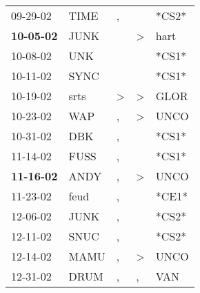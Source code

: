 \begin{supertabular}{p{0.07\textwidth}p{0.06\textwidth}p{0.02\textwidth}p{0.02\textwidth}p{0.06\textwidth}}
          09-29-02\textsuperscript{} &           TIME\textsuperscript{} &                , &                  &                            *CS2* \\
 \textbf{10-05-02\textsuperscript{}} &           JUNK\textsuperscript{} &                  &     \textgreater &           hart\textsuperscript{} \\
          10-08-02\textsuperscript{} &            UNK\textsuperscript{} &                  &                  &                            *CS1* \\
          10-11-02\textsuperscript{} &           SYNC\textsuperscript{} &                  &                  &                            *CS1* \\
          10-19-02\textsuperscript{} &           srts\textsuperscript{} &     \textgreater &     \textgreater &           GLOR\textsuperscript{} \\
          10-23-02\textsuperscript{} &            WAP\textsuperscript{} &                , &     \textgreater &           UNCO\textsuperscript{} \\
          10-31-02\textsuperscript{} &            DBK\textsuperscript{} &                , &                  &                            *CS1* \\
          11-14-02\textsuperscript{} &           FUSS\textsuperscript{} &                , &                  &                            *CS1* \\
 \textbf{11-16-02\textsuperscript{}} &           ANDY\textsuperscript{} &                , &     \textgreater &           UNCO\textsuperscript{} \\
          11-23-02\textsuperscript{} &           feud\textsuperscript{} &                , &                  &                            *CE1* \\
          12-06-02\textsuperscript{} &           JUNK\textsuperscript{} &                , &                  &                            *CS2* \\
          12-11-02\textsuperscript{} &           SNUC\textsuperscript{} &                , &                  &                            *CS2* \\
          12-14-02\textsuperscript{} &           MAMU\textsuperscript{} &                , &     \textgreater &           UNCO\textsuperscript{} \\
          12-31-02\textsuperscript{} &           DRUM\textsuperscript{} &                , &                , &            VAN\textsuperscript{} \\

\end{supertabular}
